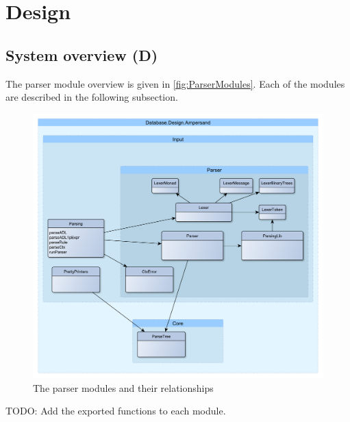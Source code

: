 
\section{Design}
\label{sec:design}

\subsection{System overview (D)}
  The parser module overview is given in \autoref{fig:ParserModules}.
  Each of the modules are described in the following subsection.
  \begin{figure}[ht]%
    \includegraphics[width=\columnwidth]{Figures/ParserModules}
    \caption{The parser modules and their relationships}
    \label{fig:ParserModules}
  \end{figure}%
  TODO: Add the exported functions to each module.

